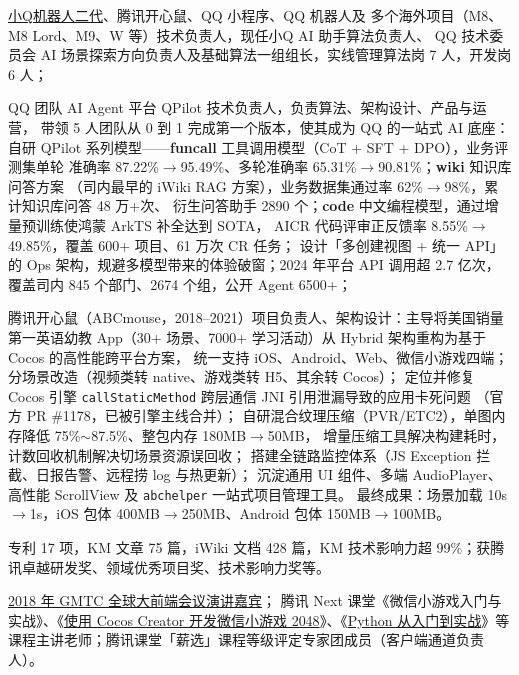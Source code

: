 {
  \begin{tightitemize}%
  \item \href{https://qrobot.qq.com/}{小Q机器人二代}、腾讯开心鼠、QQ 小程序、QQ 机器人及
    多个海外项目（M8、M8 Lord、M9、W 等）技术负责人，现任小Q AI 助手算法负责人、
    QQ 技术委员会 AI 场景探索方向负责人及基础算法一组组长，实线管理算法岗 7 人，开发岗 6 人；
  \item QQ 团队 AI Agent 平台 QPilot 技术负责人，负责算法、架构设计、产品与运营，
    带领 5 人团队从 0 到 1 完成第一个版本，使其成为 QQ 的一站式 AI 底座：
    自研 QPilot 系列模型——\textbf{funcall} 工具调用模型（CoT + SFT + DPO），业务评测集单轮
    准确率 87.22\%$\rightarrow$95.49\%、多轮准确率 65.31\%$\rightarrow$90.81\%；\textbf{wiki} 知识库问答方案
    （司内最早的 iWiki RAG 方案），业务数据集通过率 62\%$\rightarrow$98\%，累计知识库问答 48 万+次、
    衍生问答助手 2890 个；\textbf{code} 中文编程模型，通过增量预训练使鸿蒙 ArkTS 补全达到 SOTA，
    AICR 代码评审正反馈率 8.55\%$\rightarrow$49.85\%，覆盖 600+ 项目、61 万次 CR 任务；
    设计「多创建视图 + 统一 API」的 Ops 架构，规避多模型带来的体验破窗；2024 年平台
    API 调用超 2.7 亿次，覆盖司内 845 个部门、2674 个组，公开 Agent 6500+；
  \item 腾讯开心鼠（ABCmouse，2018--2021）项目负责人、架构设计：主导将美国销量第一英语幼教
    App（30+ 场景、7000+ 学习活动）从 Hybrid 架构重构为基于 Cocos 的高性能跨平台方案，
    统一支持 iOS、Android、Web、微信小游戏四端；
    分场景改造（视频类转 native、游戏类转 H5、其余转 Cocos）；
    定位并修复 Cocos 引擎 \texttt{callStaticMethod} 跨层通信 JNI 引用泄漏导致的应用卡死问题
    （官方 PR \#1178，已被引擎主线合并）；
    自研混合纹理压缩（PVR/ETC2），单图内存降低 75\%$\sim$87.5\%、整包内存 180MB$\rightarrow$50MB，
    增量压缩工具解决构建耗时，计数回收机制解决切场景资源误回收；
    搭建全链路监控体系（JS Exception 拦截、日报告警、远程捞 log 与热更新）；
    沉淀通用 UI 组件、多端 AudioPlayer、高性能 ScrollView 及 \texttt{abchelper} 一站式项目管理工具。
    最终成果：场景加载 10s$\rightarrow$1s，iOS 包体 400MB$\rightarrow$250MB、Android 包体 150MB$\rightarrow$100MB。
  \item 专利 17 项，KM 文章 75 篇，iWiki 文档 428 篇，KM 技术影响力超 99\%；获腾讯卓越研发奖、领域优秀项目奖、技术影响力奖等。
  \item \href{https://www.infoq.cn/article/QXiWs69g24PMk0ldg1to}{2018 年 GMTC 全球大前端会议演讲嘉宾}；
    腾讯 Next 课堂《微信小游戏入门与实战》、《\href{https://ke.qq.com/course/350627?from=800004380}{使用 Cocos Creator 开发微信小游戏 2048}》、《\href{https://ke.qq.com/course/384790?tuin=1b8113f4}{Python 从入门到实战}》等课程主讲老师；腾讯课堂「薪选」课程等级评定专家团成员（客户端通道负责人）。
  \end{tightitemize}}

